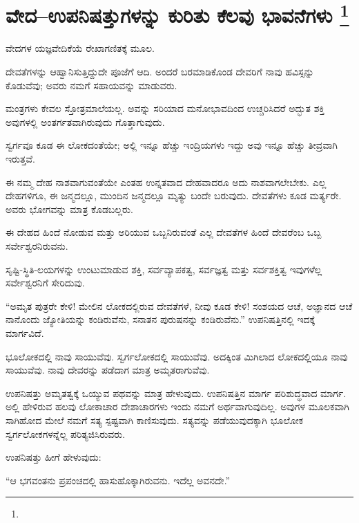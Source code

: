 
\vspace{-0.6cm}

\chapter[ವೇದ–ಉಪನಿಷತ್ತುಗಳನ್ನು ಕುರಿತು ಕೆಲವು ಭಾವನೆಗಳು ]{ವೇದ–ಉಪನಿಷತ್ತುಗಳನ್ನು ಕುರಿತು ಕೆಲವು ಭಾವನೆಗಳು \protect\footnote{}}

ವೇದಗಳ ಯಜ್ಞವೇದಿಕೆಯೆ ರೇಖಾಗಣಿತಕ್ಕೆ  ಮೂಲ.

ದೇವತೆಗಳನ್ನು ಆಹ್ವಾನಿಸುತ್ತಿದ್ದುದೇ ಪೂಜೆಗೆ ಆದಿ. ಅಂದರೆ ಬರಮಾಡಿಕೊಂಡ ದೇವರಿಗೆ ನಾವು ಹವಿಸ್ಸನ್ನು ಕೊಡುವೆವು; ಅವರು ನಮಗೆ ಸಹಾಯವನ್ನು ಮಾಡುವರು.

ಮಂತ್ರಗಳು ಕೇವಲ ಸ್ತೋತ್ರಮಾಲೆಯಲ್ಲ. ಅವನ್ನು ಸರಿಯಾದ ಮನೋಭಾವದಿಂದ ಉಚ್ಚರಿಸಿದರೆ ಅದ್ಭುತ ಶಕ್ತಿ ಅವುಗಳಲ್ಲಿ ಅಂತರ್ಗತವಾಗಿರುವುದು ಗೊತ್ತಾಗುವುದು.

ಸ್ವರ್ಗವೂ ಕೂಡ ಈ ಲೋಕದಂತೆಯೇ; ಅಲ್ಲಿ ಇನ್ನೂ ಹೆಚ್ಚು ಇಂದ್ರಿಯಗಳು ಇದ್ದು ಅವು ಇನ್ನೂ ಹೆಚ್ಚು ತೀವ್ರವಾಗಿ ಇರುತ್ತವೆ.

ಈ ನಮ್ಮ ದೇಹ ನಾಶವಾಗುವಂತೆಯೇ ಎಂತಹ ಉನ್ನತವಾದ ದೇಹವಾದರೂ ಅದು ನಾಶವಾಗಲೇಬೇಕು. ಎಲ್ಲ ದೇಹಗಳಿಗೂ, ಈ ಜನ್ಮದಲ್ಲೂ, ಮುಂದಿನ ಜನ್ಮದಲ್ಲೂ ಮೃತ್ಯು ಬಂದೇ ಬರುವುದು. ದೇವತೆಗಳು ಕೂಡ ಮರ್ತ್ಯರೇ. ಅವರು ಭೋಗವನ್ನು ಮಾತ್ರ ಕೊಡಬಲ್ಲರು.

ಈ ದೇಹದ ಹಿಂದೆ ನೋಡುವ ಮತ್ತು ಅರಿಯುವ ಒಬ್ಬನಿರುವಂತೆ ಎಲ್ಲ ದೇವತೆಗಳ ಹಿಂದೆ ದೇವರೆಂಬ ಒಬ್ಬ ಸರ್ವೇಶ್ವರನಿರುವನು.

ಸೃಷ್ಟಿ-ಸ್ಥಿತಿ-ಲಯಗಳನ್ನು ಉಂಟುಮಾಡುವ ಶಕ್ತಿ, ಸರ್ವವ್ಯಾಪಕತ್ವ, ಸರ್ವಜ್ಞತ್ವ ಮತ್ತು ಸರ್ವಶಕ್ತಿತ್ವ ಇವುಗಳೆಲ್ಲ ಸರ್ವೇಶ್ವರನಿಗೆ ಸೇರಿದುವು.

\vskip 5pt

“ಅಮೃತ ಪುತ್ರರೇ ಕೇಳಿ! ಮೇಲಿನ ಲೋಕದಲ್ಲಿರುವ ದೇವತೆಗಳೆ, ನೀವು ಕೂಡ ಕೇಳಿ! ಸಂಶಯದ ಆಚೆ, ಅಜ್ಞಾನದ ಆಚೆ ನಾನೊಂದು ಜ್ಯೋತಿಯನ್ನು ಕಂಡಿರುವೆನು, ಸನಾತನ ಪುರುಷನನ್ನು ಕಂಡಿರುವೆನು.” ಉಪನಿಷತ್ತಿನಲ್ಲಿ ಇದಕ್ಕೆ ಮಾರ್ಗವಿದೆ.

\vskip 5pt

ಭೂಲೋಕದಲ್ಲಿ ನಾವು ಸಾಯುವೆವು. ಸ್ವರ್ಗಲೋಕದಲ್ಲಿ ಸಾಯುವೆವು. ಅದಕ್ಕಿಂತ ಮಿಗಿಲಾದ ಲೋಕದಲ್ಲಿಯೂ ನಾವು ಸಾಯುವೆವು. ನಾವು ದೇವರನ್ನು ಪಡೆದಾಗ ಮಾತ್ರ ಅಮೃತರಾಗುವೆವು.

\vskip 5pt

ಉಪನಿಷತ್ತು ಅಮೃತತ್ವಕ್ಕೆ ಒಯ್ಯುವ ಪಥವನ್ನು ಮಾತ್ರ ಹೇಳುವುದು. ಉಪನಿಷತ್ತಿನ ಮಾರ್ಗ ಪರಿಶುದ್ಧವಾದ ಮಾರ್ಗ. ಅಲ್ಲಿ ಹೇಳಿರುವ ಹಲವು ಲೋಕಾಚಾರ ದೇಶಾಚಾರಗಳು ಇಂದು ನಮಗೆ ಅರ್ಥವಾಗುವುದಿಲ್ಲ. ಅವುಗಳ ಮೂಲಕವಾಗಿ ಸಾಗಿಹೋದ ಮೇಲೆ ನಮಗೆ ಸತ್ಯ ಸ್ಪಷ್ಟವಾಗಿ ಕಾಣಿಸುವುದು. ಸತ್ಯವನ್ನು ಪಡೆಯುವುದಕ್ಕಾಗಿ ಭೂಲೋಕ ಸ್ವರ್ಗಲೋಕಗಳನ್ನೆಲ್ಲ ಪರಿತ್ಯಜಿಸಿರುವರು.

\vskip 5pt

ಉಪನಿಷತ್ತು ಹೀಗೆ ಹೇಳುವುದು:

“ಆ ಭಗವಂತನು ಪ್ರಪಂಚದಲ್ಲಿ ಹಾಸುಹೊಕ್ಕಾಗಿರುವನು. ಇದೆಲ್ಲ ಅವನದೇ.”

